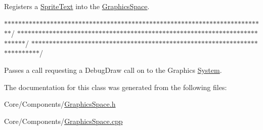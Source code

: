 Registers a \hyperlink{classDCEngine_1_1Components_1_1SpriteText}{Sprite\-Text} into the \hyperlink{classDCEngine_1_1Components_1_1GraphicsSpace}{Graphics\-Space}. 

$\ast$$\ast$$\ast$$\ast$$\ast$$\ast$$\ast$$\ast$$\ast$$\ast$$\ast$$\ast$$\ast$$\ast$$\ast$$\ast$$\ast$$\ast$$\ast$$\ast$$\ast$$\ast$$\ast$$\ast$$\ast$$\ast$$\ast$$\ast$$\ast$$\ast$$\ast$$\ast$$\ast$$\ast$$\ast$$\ast$$\ast$$\ast$$\ast$$\ast$$\ast$$\ast$$\ast$$\ast$$\ast$$\ast$$\ast$$\ast$$\ast$$\ast$$\ast$$\ast$$\ast$$\ast$$\ast$$\ast$$\ast$$\ast$$\ast$$\ast$$\ast$$\ast$$\ast$$\ast$$\ast$$\ast$$\ast$$\ast$$\ast$$\ast$$\ast$$\ast$$\ast$$\ast$/ $\ast$$\ast$$\ast$$\ast$$\ast$$\ast$$\ast$$\ast$$\ast$$\ast$$\ast$$\ast$$\ast$$\ast$$\ast$$\ast$$\ast$$\ast$$\ast$$\ast$$\ast$$\ast$$\ast$$\ast$$\ast$$\ast$$\ast$$\ast$$\ast$$\ast$$\ast$$\ast$$\ast$$\ast$$\ast$$\ast$$\ast$$\ast$$\ast$$\ast$$\ast$$\ast$$\ast$$\ast$$\ast$$\ast$$\ast$$\ast$$\ast$$\ast$$\ast$$\ast$$\ast$$\ast$$\ast$$\ast$$\ast$$\ast$$\ast$$\ast$$\ast$$\ast$$\ast$$\ast$$\ast$$\ast$$\ast$$\ast$$\ast$$\ast$$\ast$$\ast$$\ast$$\ast$/ $\ast$$\ast$$\ast$$\ast$$\ast$$\ast$$\ast$$\ast$$\ast$$\ast$$\ast$$\ast$$\ast$$\ast$$\ast$$\ast$$\ast$$\ast$$\ast$$\ast$$\ast$$\ast$$\ast$$\ast$$\ast$$\ast$$\ast$$\ast$$\ast$$\ast$$\ast$$\ast$$\ast$$\ast$$\ast$$\ast$$\ast$$\ast$$\ast$$\ast$$\ast$$\ast$$\ast$$\ast$$\ast$$\ast$$\ast$$\ast$$\ast$$\ast$$\ast$$\ast$$\ast$$\ast$$\ast$$\ast$$\ast$$\ast$$\ast$$\ast$$\ast$$\ast$$\ast$$\ast$$\ast$$\ast$$\ast$$\ast$$\ast$$\ast$$\ast$$\ast$$\ast$$\ast$/

Passes a call requesting a Debug\-Draw call on to the Graphics \hyperlink{classDCEngine_1_1System}{System}. 

The documentation for this class was generated from the following files\-:\begin{DoxyCompactItemize}
\item 
Core/\-Components/\hyperlink{GraphicsSpace_8h}{Graphics\-Space.\-h}\item 
Core/\-Components/\hyperlink{GraphicsSpace_8cpp}{Graphics\-Space.\-cpp}\end{DoxyCompactItemize}
